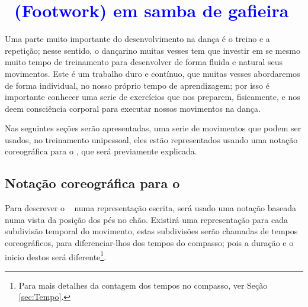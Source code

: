 

\chapter{\textcolor{blue}{\Footwork~(Footwork) em samba de gafieira}}

Uma parte muito importante do desenvolvimento na dança é o treino e a repetição;
nesse sentido, o dançarino muitas vesses tem que investir em se mesmo muito tempo 
de treinamento para desenvolver de forma fluida e natural seus movimentos.
Este é um trabalho duro e contínuo, que muitas vesses abordaremos de forma individual, 
no nosso próprio tempo de aprendizagem; 
por isso é importante conhecer uma serie de exercícios que nos preparem,
fisicamente, e nos deem consciência corporal para executar nossos movimentos na dança.

Nas seguintes seções serão apresentadas, uma serie de movimentos que podem ser usados,
no treinamento unipessoal, eles estão representados usando uma notação coreográfica
para o \footwork, que será previamente explicada.
 
\section{Notação coreográfica para o \footwork }
Para descrever o \footwork~ numa representação escrita, 
será usado uma notação baseada numa vista da posição dos pés no chão. 
Existirá uma representação para cada subdivisão temporal do movimento, 
estas subdivisões serão chamadas de tempos coreográficos, 
para diferenciar-lhos dos tempos do compasso; 
pois a duração e o inicio destos será diferente\footnote{Para 
mais detalhes da contagem dos tempos no compasso, ver Seção \ref{sec:Tempo}.}.

